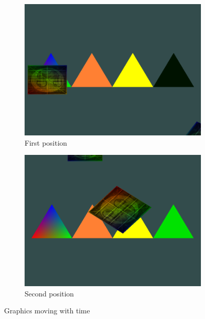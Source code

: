 \documentclass[12pt]{article}
\begin{document}
    \begin{figure}[H]
        \centering
        \begin{subfigure}[b]{0.45\textwidth}
            \centering
            \includegraphics[width=\textwidth]{openGLMovingFirst.png}
            \caption{First position}
        \end{subfigure}
        \hfill
        \begin{subfigure}[b]{0.45\textwidth}
            \centering
            \includegraphics[width=\textwidth]{openGLMovingSecond.png}
            \caption{Second position}
        \end{subfigure}
        \caption{Graphics moving with time}
    \end{figure}
\end{document}
